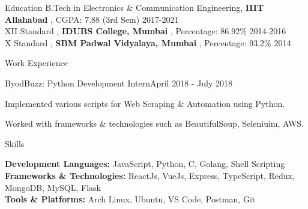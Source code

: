 \documentclass{resume} %
\begin{document}
  


\begin{rSection}{Education}
{ B.Tech in Electronics \& Communication Engineering, \textbf{IIIT Allahabad} ,  CGPA: 7.88 (3rd Sem)} \hfill {2017-2021}
\\
{ XII Standard  , \textbf{IDUBS College, Mumbai} , Percentage: 86.92\%} \hfill {2014-2016}
\\
{ X Standard  , \textbf{SBM Padwal Vidyalaya, Mumbai} , Percentage: 93.2\%}  \hfill {2014}
\end{rSection} 


\begin{rSection}{ Work Experience } \itemsep -1pt        

\begin{rSubsection}{ByodBuzz: Python Development Intern}{April 2018 - July 2018}{}    

\vspace{-3pt}

\item Implemented various scripts for Web Scraping \& Automation using Python.
\item Worked with frameworks \& technologies such as BeautifulSoup, Seleniuim, AWS.
\end{rSubsection} 

\vspace{-4pt}

 
\end{rSection}


\begin{rSection}{Skills} \itemsep -3pt  

{\textbf{Development Languages:} JavaScript, Python, C, Golang, Shell Scripting }  
\\
{\textbf{Frameworks \& Technologies:} ReactJs, VueJs, Express, TypeScript, Redux, MongoDB, MySQL, Flask }
\\
{\textbf{Tools \& Platforms:} Arch Linux, Ubuntu, VS Code, Postman, Git }
\end{rSection}  

\end{document}
